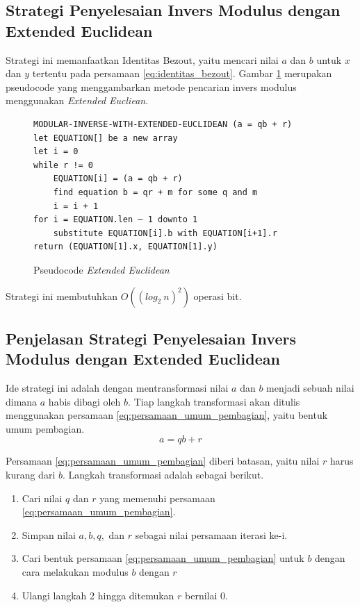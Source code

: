 \subsection {Strategi Penyelesaian Invers Modulus dengan Extended Euclidean}

Strategi ini memanfaatkan Identitas Bezout, yaitu mencari nilai $ a $ dan $ b $ untuk $ x $ dan $ y $ tertentu pada persamaan \eqref{eq:identitas_bezout}. Gambar \ref{psdo:extended_euclidean} merupakan pseudocode yang menggambarkan metode pencarian invers modulus menggunakan \textit{Extended Eucliean}.

\begin{figure}[h!]
\begin{lstlisting}[firstnumber=0]
MODULAR-INVERSE-WITH-EXTENDED-EUCLIDEAN (a = qb + r)
let EQUATION[] be a new array
let i = 0
while r != 0
	EQUATION[i] = (a = qb + r)
	find equation b = qr + m for some q and m
	i = i + 1
for i = EQUATION.len – 1 downto 1
	substitute EQUATION[i].b with EQUATION[i+1].r
return (EQUATION[1].x, EQUATION[1].y)
\end{lstlisting}
\caption{Pseudocode \textit{Extended Euclidean}}
\label{psdo:extended_euclidean}
\end{figure}

Strategi ini membutuhkan $ O((log_2\ n)^2) $ operasi bit. \cite{hac_math}

\subsection{ Penjelasan Strategi Penyelesaian Invers Modulus dengan Extended Euclidean}

Ide strategi ini adalah dengan mentransformasi nilai $ a $ dan $ b $ menjadi sebuah nilai dimana $ a $ habis dibagi oleh $ b $. Tiap langkah transformasi akan ditulis menggunakan persamaan \eqref{eq:persamaan_umum_pembagian}, yaitu bentuk umum pembagian.
\begin{equation*}
a=qb+r
\end{equation*}

Persamaan \eqref{eq:persamaan_umum_pembagian} diberi batasan, yaitu nilai $ r $ harus kurang dari $ b $. Langkah transformasi adalah sebagai berikut.
\begin{enumerate}
\item Cari nilai $ q $ dan $ r $ yang memenuhi persamaan \eqref{eq:persamaan_umum_pembagian}.
\item Simpan nilai $ a, b, q, $ dan $ r $ sebagai nilai persamaan iterasi ke-i.
\item Cari bentuk persamaan \eqref{eq:persamaan_umum_pembagian} untuk $ b $ dengan cara melakukan modulus $ b $ dengan $ r $
\item Ulangi langkah 2 hingga ditemukan $ r $ bernilai 0.
\end{enumerate}

